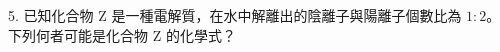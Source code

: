 \documentclass[12pt]{article}
\begin{document}
\begin{problem}
  \item[5.] 已知化合物 Z 是一種電解質，在水中解離出的陰離子與陽離子個數比為 $1:2$。下列何者可能是化合物 Z 的化學式？
  \begin{choices}
    \item {}
    \item {}
    \item {}
    \item {}
  \end{choices}
\end{problem}
\end{document}
